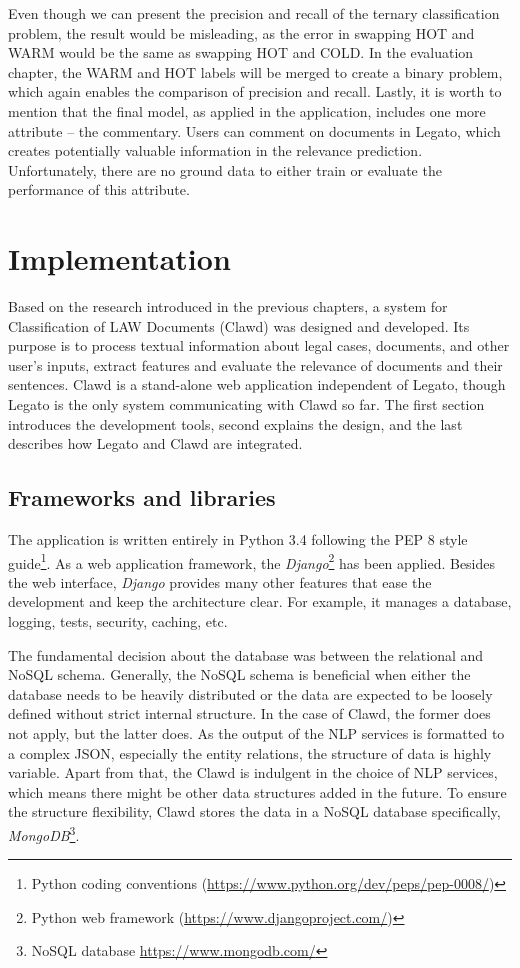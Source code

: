 \documentclass[
  digital, %
  notable,   %
  nolof,     %
  nolot,     %
]{fithesis3}
\begin{document}
Even though we can present the precision and recall of the ternary classification problem, the result would be misleading, as the error in swapping HOT and WARM would be the same as swapping HOT and COLD.
In the evaluation chapter, the WARM and HOT labels will be merged to create a binary problem, which again enables the comparison of precision and recall.
Lastly, it is worth to mention that the final model, as applied in the application, includes one more attribute -- the commentary.
Users can comment on documents in Legato, which creates potentially valuable information in the relevance prediction.
Unfortunately, there are no ground data to either train or evaluate the performance of this attribute.

\chapter{Implementation}
\label{chp:implementation}
Based on the research introduced in the previous chapters, a system for Classification of LAW Documents (Clawd) was designed and developed.
Its purpose is to process textual information about legal cases, documents, and other user's inputs, extract features and evaluate the relevance of documents and their sentences.
Clawd is a stand-alone web application independent of Legato, though Legato is the only system communicating with Clawd so far.
The first section introduces the development tools, second explains the design, and the last describes how Legato and Clawd are integrated.

\section{Frameworks and libraries}
The application is written entirely in Python 3.4 following the PEP 8 style guide\footnote{Python coding conventions (\url{https://www.python.org/dev/peps/pep-0008/})}.
As a web application framework, the \textit{Django}\footnote{Python web framework (\url{https://www.djangoproject.com/})} has been applied.
Besides the web interface, \textit{Django} provides many other features that ease the development and keep the architecture clear.
For example, it manages a database, logging, tests, security, caching, etc.

The fundamental decision about the database was between the relational and NoSQL schema.
Generally, the NoSQL schema is beneficial when either the database needs to be heavily distributed or the data are expected to be loosely defined without strict internal structure.
In the case of Clawd, the former does not apply, but the latter does.
As the output of the NLP services is formatted to a complex JSON, especially the entity relations, the structure of data is highly variable.
Apart from that, the Clawd is indulgent in the choice of NLP services, which means there might be other data structures added in the future.
To ensure the structure flexibility, Clawd stores the data in a NoSQL database specifically, \textit{MongoDB}\footnote{NoSQL database \url{https://www.mongodb.com/}}.
\end{document}
